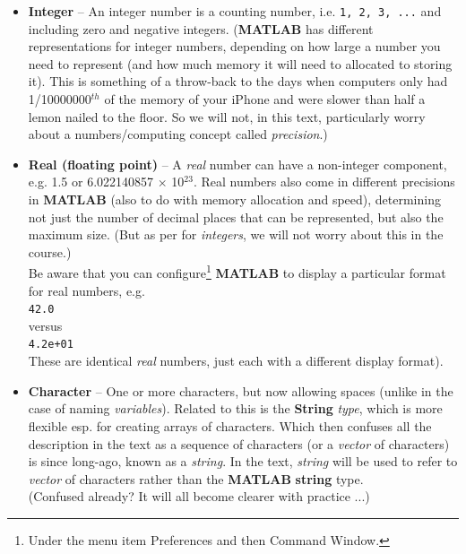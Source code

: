 \documentclass{tufte-book} %
\begin{document}
\begin{itemize}
\setlength{\itemindent}{.2in}

\item \textbf{Integer} -- An integer number is a counting number, i.e. \texttt{1, 2, 3, ...} and including zero and negative integers.
(\textbf{MATLAB} has different representations for integer numbers, depending on how large a number you need to represent (and how much memory it will need to allocated to storing it). This is something of a throw-back to the days when computers only had 1/10000000\(^{th}\) of the memory of your iPhone and were slower than half a lemon nailed to the floor. So we will not, in this text, particularly worry about a numbers/computing concept called \textit{precision}.)

\item \textbf{Real (floating point)} -- A \textit{real} number can have a non-integer component, e.g. 1.5 or 6.022140857 \(\times\) 10\(^{23}\). Real numbers also come in different precisions in \textbf{MATLAB} (also to do with memory allocation and speed), determining not just the number of decimal places that can be represented, but also the maximum size. (But as per for \textit{integers}, we will not worry about this in the course.)
\\Be aware that you can configure\footnote{Under the menu item \textsf{Preferences} and then \textsf{Command Window}.} \textbf{MATLAB} to display a particular format for real numbers, e.g.
\vspace{1mm}
\\\texttt{42.0}
\\versus
\\\texttt{4.2e+01}
\vspace{1mm}
\\These are identical \textit{real} numbers, just each with a different display format).

\item \textbf{Character} -- One or more characters, but now allowing spaces (unlike in the case of naming \textit{variables}).
Related to this is the \textbf{String} \textit{type}, which is more flexible esp. for creating arrays of characters. Which then confuses all the description in the text as a sequence of characters (or a \textit{vector} of characters) is since long-ago, known as a \textit{string}. In the text, \textit{string} will be used to refer to \textit{vector} of characters rather than the \textbf{MATLAB} \textbf{string} type.
\\(Confused already? It will all become clearer with practice ...) 


\end{itemize}
\end{document}
